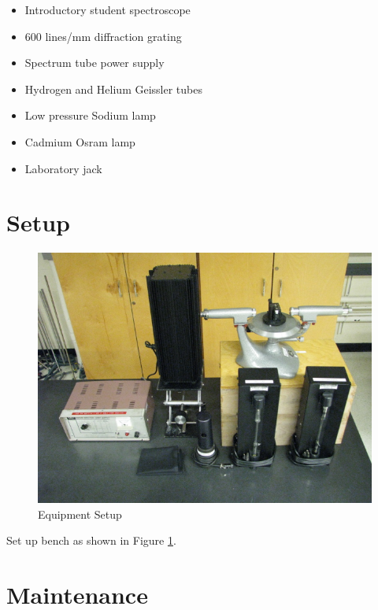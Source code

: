 \begin{minipage}[t]{0.6\textwidth}
\begin{itemize}[noitemsep]
\item Introductory student spectroscope
\item 600 lines/mm diffraction grating
\item Spectrum tube power supply
\item Hydrogen and Helium Geissler tubes 
\end{itemize}
\end{minipage}
\begin{minipage}[t]{0.4\textwidth}
\begin{itemize}[noitemsep]
\item Low pressure Sodium lamp
\item Cadmium Osram lamp
\item Laboratory jack
\end{itemize}
\end{minipage}

\section{Setup}
\begin{figure}
\includegraphics{Spectroscopy-Setup.jpg}
\caption{Equipment Setup}
\label{pic:SPsetup}
\end{figure}

Set up bench as shown in Figure \ref{pic:SPsetup}.

\section{Maintenance}

